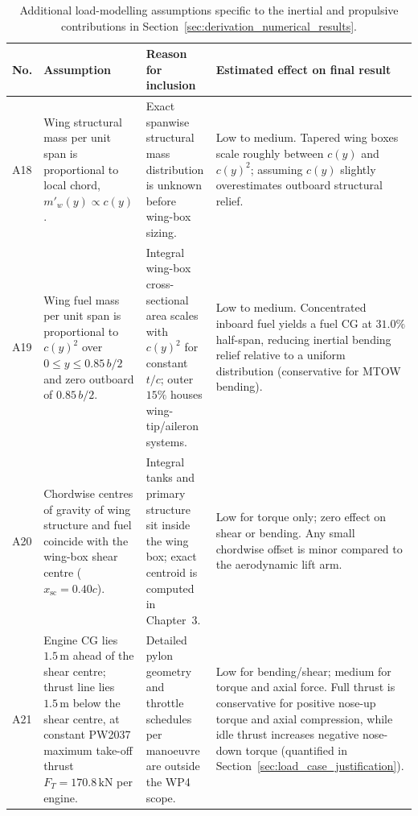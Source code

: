 
\begin{table}[htbp]
    \centering
    \caption{Additional load-modelling assumptions specific to the inertial and propulsive contributions in Section~\ref{sec:derivation_numerical_results}.}
    \label{tab:assumptions_wp41_extra}
    \begin{tabular}{@{}p{0.7cm}p{4.3cm}p{4.1cm}p{4.7cm}@{}}
        \toprule
        \textbf{No.} & \textbf{Assumption} & \textbf{Reason for inclusion} & \textbf{Estimated effect on final result} \\
        \midrule
        A18 & Wing structural mass per unit span is proportional to local chord, $m'_w(y) \propto c(y)$. & Exact spanwise structural mass distribution is unknown before wing-box sizing. & Low to medium. Tapered wing boxes scale roughly between $c(y)$ and $c(y)^2$; assuming $c(y)$ slightly overestimates outboard structural relief. \\
        A19 & Wing fuel mass per unit span is proportional to $c(y)^2$ over $0 \le y \le 0.85\,b/2$ and zero outboard of $0.85\,b/2$. & Integral wing-box cross-sectional area scales with $c(y)^2$ for constant $t/c$; outer $15\%$ houses wing-tip/aileron systems. & Low to medium. Concentrated inboard fuel yields a fuel CG at $31.0\%$ half-span, reducing inertial bending relief relative to a uniform distribution (conservative for MTOW bending). \\
        A20 & Chordwise centres of gravity of wing structure and fuel coincide with the wing-box shear centre ($x_{\mathrm{sc}} = 0.40c$). & Integral tanks and primary structure sit inside the wing box; exact centroid is computed in Chapter~3. & Low for torque only; zero effect on shear or bending. Any small chordwise offset is minor compared to the aerodynamic lift arm. \\
        A21 & Engine CG lies $1.5\,\text{m}$ ahead of the shear centre; thrust line lies $1.5\,\text{m}$ below the shear centre, at constant PW2037 maximum take-off thrust $F_T = 170.8\,\text{kN}$ per engine. & Detailed pylon geometry and throttle schedules per manoeuvre are outside the WP4 scope. & Low for bending/shear; medium for torque and axial force. Full thrust is conservative for positive nose-up torque and axial compression, while idle thrust increases negative nose-down torque (quantified in Section~\ref{sec:load_case_justification}). \\
        \bottomrule
    \end{tabular}
\end{table}

